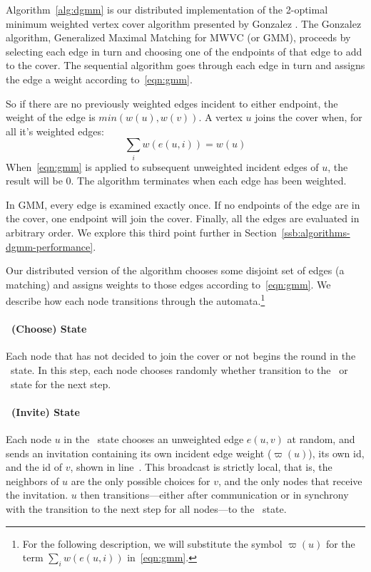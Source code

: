 \label{sec:dgmm-description}

Algorithm~\ref{alg:dgmm} is our distributed implementation of the 2-optimal minimum weighted vertex cover algorithm presented by Gonzalez \cite{Gonzalez1995129}. The Gonzalez algorithm, Generalized Maximal Matching for MWVC (or GMM), proceeds by selecting each edge in turn and choosing one of the endpoints of that edge to add to the cover. The sequential algorithm goes through each edge in turn and assigns the edge a weight according to~\eqref{eqn:gmm}.



So if there are no previously weighted edges incident to either endpoint, the weight of the edge is $min(w(u),w(v))$. A vertex $u$ joins the cover when, for all it's weighted edges: \begin{equation}\sum_i w(e(u,i)) = w(u) \label{eqn:sat} \end{equation} When~\eqref{eqn:gmm} is applied to subsequent unweighted incident edges of $u$, the result will be 0. The algorithm terminates when each edge has been weighted. 

In GMM, every edge is examined exactly once. If no endpoints of the edge are in the cover, one endpoint will join the cover. Finally, all the edges are evaluated in arbitrary order. We explore this third point further in Section~\ref{ssb:algorithms-dgmm-performance}. 

Our distributed version of the algorithm chooses some disjoint set of edges (a matching) and assigns weights to those edges according to~\eqref{eqn:gmm}. We describe how each node transitions through the automata.\footnote{For the following description, we will substitute the symbol $\varpi(u)$ for the term $\sum_i w(e(u,i))$ in~\eqref{eqn:gmm}.\label{fn:varpi}}

\paragraph{\cCd\ (Choose) State} 
Each node that has not decided to join the cover or not begins the round in the \cCd\ state. In this step, each node chooses randomly whether transition to the \cId\ or \cLd\ state for the next step.

\paragraph{\cId\ (Invite) State}
Each node $u$ in the \cId\ state chooses an unweighted edge $e(u,v)$ at random, and sends an invitation containing its own incident edge weight ($\varpi(u)$)\footnotemark[\value{footnote}], its own id, and the id of $v$, shown in line~. This broadcast is strictly local, that is, the neighbors of $u$ are the only possible choices for $v$, and the only nodes that receive the invitation. $u$ then transitions---either after communication or in synchrony with the transition to the next step for all nodes---to the \cWd\ state. 

